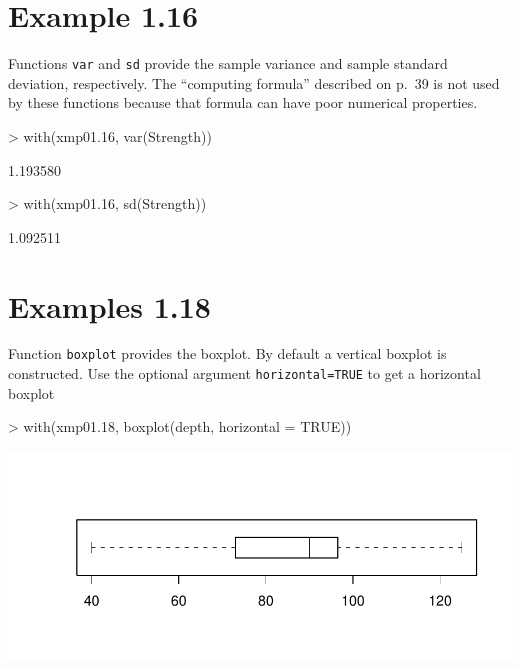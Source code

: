 \documentclass{book}
\begin{document}
\section{Example 1.16}
\label{sec:xmp01.16}

Functions \texttt{var} and \texttt{sd} provide the sample variance and
sample standard deviation, respectively.  The ``computing formula''
described on p.~39 is not used by these functions because that formula
can have poor numerical properties.
\begin{Schunk}
\begin{Sinput}
> with(xmp01.16, var(Strength))
\end{Sinput}
\begin{Soutput}
[1] 1.193580
\end{Soutput}
\begin{Sinput}
> with(xmp01.16, sd(Strength))
\end{Sinput}
\begin{Soutput}
[1] 1.092511
\end{Soutput}
\end{Schunk}


\section{Examples 1.18}
\label{sec:xmp01.18}

Function \texttt{boxplot} provides the boxplot.  By default a vertical
boxplot is constructed.  Use the optional argument
\texttt{horizontal=TRUE} to get a horizontal boxplot
\begin{center}
\begin{Schunk}
\begin{Sinput}
> with(xmp01.18, boxplot(depth, horizontal = TRUE))
\end{Sinput}
\end{Schunk}
\includegraphics{Devore6-xmp0118}
\end{center}
\end{document}
